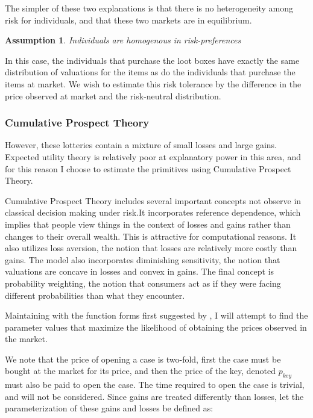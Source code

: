 \documentclass[12pt]{paper}
\newtheorem{assume}{Assumption}
\begin{document}
The simpler of these two explanations is that there is no
heterogeneity among risk for individuals, and that these two markets
are in equilibrium.

\begin{assume}
  Individuals are homogenous in risk-preferences
\end{assume}

In this case, the individuals that purchase the
loot boxes have exactly the same distribution of valuations for the
items as do the individuals that purchase the items at market. We wish
to estimate this risk tolerance by the difference in the price
observed at market and the risk-neutral distribution.


\subsubsection{Cumulative Prospect Theory}

However, these lotteries contain a mixture of small losses and large
gains. Expected utility theory is relatively poor at explanatory power
in this area, and for this reason I choose to estimate the primitives
using Cumulative Prospect Theory.

Cumulative Prospect Theory includes several important concepts not
observe in classical decision making under risk.It incorporates
reference dependence, which implies that people view things in the
context of losses and gains rather than changes to their overall
wealth. This is attractive for computational reasons. It also utilizes
loss aversion, the notion that losses are relatively more costly than
gains. The model also incorporates diminishing sensitivity, the notion
that valuations are concave in losses and convex in gains. The final
concept is probability weighting, the notion that consumers act as if
they were facing different probabilities than what they encounter.

Maintaining with the function forms first suggested by \cite*{Kahn},
I will attempt to find the parameter values that maximize the
likelihood of obtaining the prices observed in the market.

We note that the price of opening a case is two-fold, first the case
must be bought at the market for its price, and then the price of the
key, denoted $p_{key}$ must also be paid to open the case. The time
required to open the case is trivial, and will not be
considered. Since gains are treated differently than losses, let the
parameterization of these gains and losses be defined as:
\end{document}
